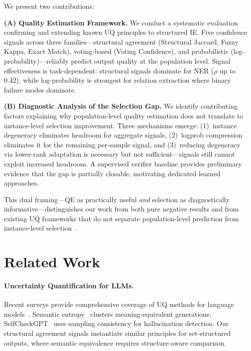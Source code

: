 \documentclass[11pt,a4paper]{article}
\begin{document}
We present two contributions:

\textbf{(A) Quality Estimation Framework.}
We conduct a systematic evaluation confirming and extending known UQ principles to structured IE.
Five confidence signals across three families---structural agreement (Structural Jaccard, Fuzzy Kappa, Exact Match), voting-based (Voting Confidence), and probabilistic (log-probability)---reliably predict output quality at the population level.
Signal effectiveness is task-dependent: structural signals dominate for NER ($\rho$ up to 0.42), while log-probability is strongest for relation extraction where binary failure modes dominate.

\textbf{(B) Diagnostic Analysis of the Selection Gap.}
We identify contributing factors explaining why population-level quality estimation does not translate to instance-level selection improvement.
Three mechanisms emerge: (1)~instance degeneracy eliminates headroom for aggregate signals, (2)~logprob compression eliminates it for the remaining per-sample signal, and (3)~reducing degeneracy via lower-rank adaptation is necessary but not sufficient---signals still cannot exploit increased headroom.
A supervised verifier baseline provides preliminary evidence that the gap is partially closable, motivating dedicated learned approaches.

This dual framing---QE as practically useful \emph{and} selection as diagnostically informative---distinguishes our work from both pure negative results and from existing UQ frameworks that do not separate population-level prediction from instance-level selection~\citep{vashurin2025cocoa,vashurin2025benchmarking}.

\section{Related Work}

\paragraph{Uncertainty Quantification for LLMs.}
Recent surveys provide comprehensive coverage of UQ methods for language models~\citep{geng2025uqsurvey,huang2025calibrationsurvey,gao2024confidencesurvey}.
Semantic entropy~\citep{kuhn2023semantic} clusters meaning-equivalent generations; SelfCheckGPT~\citep{manakul2023selfcheckgpt} uses sampling consistency for hallucination detection.
Our structural agreement signals instantiate similar principles for set-structured outputs, where semantic equivalence requires structure-aware comparison.
\end{document}
